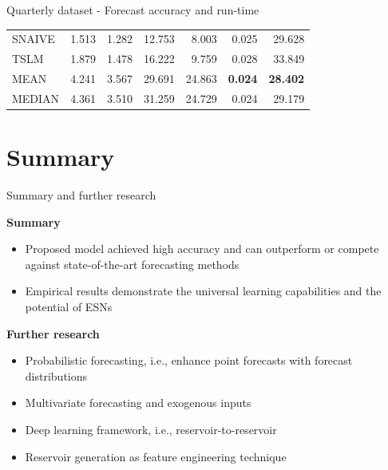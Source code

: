 \documentclass[aspectratio=169]{beamer}
\begin{document}
\begin{frame}[t]{Quarterly dataset - Forecast accuracy and run-time}
\begin{minipage}[t]{0.7\textwidth}
\begin{table}[ht]
\begin{tabular}{lrrrrrr}
				SNAIVE & 1.513 & 1.282 & 12.753 & 8.003 & 0.025 & 29.628 \\ 
				TSLM & 1.879 & 1.478 & 16.222 & 9.759 & 0.028 & 33.849 \\ 
				MEAN & 4.241 & 3.567 & 29.691 & 24.863 & \textbf{0.024} & \textbf{28.402} \\ 
				MEDIAN & 4.361 & 3.510 & 31.259 & 24.729 & 0.024 & 29.179 \\ 
				\bottomrule
			\end{tabular}
		\end{table}
    \end{minipage}
\end{frame}



\section{Summary}


\begin{frame}[t]{Summary and further research}
    \begin{minipage}[t]{0.5\textwidth}
        \vspace{0pt}
        \textbf{Summary}
        \begin{itemize}
            \item Proposed model achieved high accuracy and can outperform or compete against state-of-the-art forecasting methods
            \item Empirical results demonstrate the universal learning capabilities and the potential of ESNs
        \end{itemize}
    \end{minipage}%
    \hfill
    \begin{minipage}[t]{0.5\textwidth}
        \vspace{0pt}
        \textbf{Further research}
        \begin{itemize}
        	\item Probabilistic forecasting, i.e., enhance point forecasts with forecast distributions
        	\item Multivariate forecasting and exogenous inputs
        	\item Deep learning framework, i.e., reservoir-to-reservoir
        	\item Reservoir generation as feature engineering technique
        \end{itemize}
    \end{minipage}
\end{frame}
\end{document}
